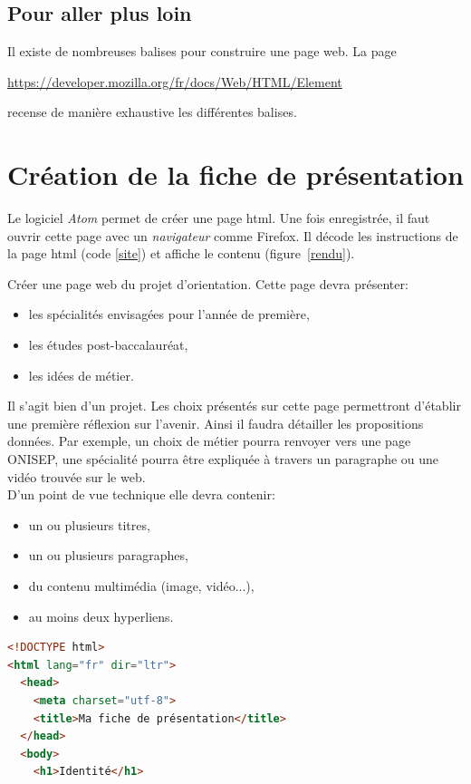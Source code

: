 \documentclass[a4paper,11pt]{article}
\begin{document}
\begin{Form}
\subsection{Pour aller plus loin}
Il existe de nombreuses balises pour construire une page web. La page \begin{center}
\url{https://developer.mozilla.org/fr/docs/Web/HTML/Element}
\end{center} recense de manière exhaustive les différentes balises.
\section{Création de la fiche de présentation}
Le logiciel \emph{Atom} permet de créer une page html. Une fois enregistrée, il faut ouvrir cette page avec un \emph{navigateur} comme Firefox. Il décode les instructions de la page html (code \ref{site}) et affiche le contenu (figure~\ref{rendu}).
\begin{activite}
Créer une page web du projet d'orientation. Cette page devra présenter:
\begin{itemize}
\item les spécialités envisagées pour l'année de première,
\item les études post-baccalauréat,
\item les idées de métier.
\end{itemize}
Il s'agit bien d'un projet. Les choix présentés sur cette page permettront d'établir une première réflexion sur l'avenir. Ainsi il faudra détailler les propositions données. Par exemple, un choix de métier pourra renvoyer vers une page ONISEP, une spécialité pourra être expliquée à travers un paragraphe ou une vidéo trouvée sur le web.
\\D'un point de vue technique elle devra contenir:
\begin{itemize}
\item un ou plusieurs titres,
\item un ou plusieurs paragraphes,
\item du contenu multimédia (image, vidéo...),
\item au moins deux hyperliens.
\end{itemize}
\end{activite}
\begin{code}[!h]
\begin{lstlisting}[language=html]
<!DOCTYPE html>
<html lang="fr" dir="ltr">
  <head>
    <meta charset="utf-8">
    <title>Ma fiche de présentation</title>
  </head>
  <body>
    <h1>Identité</h1>

\end{lstlisting}
\end{code}
\end{Form}
\end{document}
